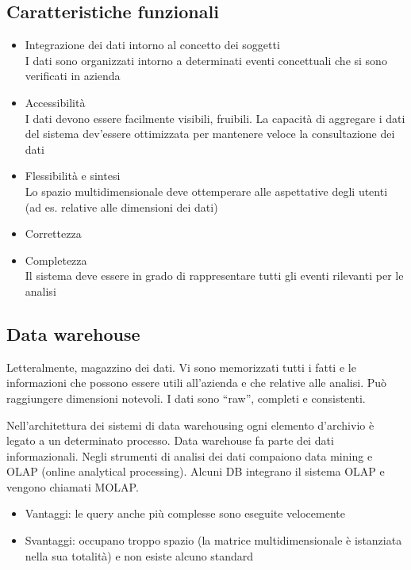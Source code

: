 \subsection{Caratteristiche
funzionali}\label{caratteristiche-funzionali}

\begin{itemize}

\item
  Integrazione dei dati intorno al concetto dei soggetti\\
  I dati sono organizzati intorno a determinati eventi concettuali che
  si sono verificati in azienda
\item
  Accessibilit\`a\\
  I dati devono essere facilmente visibili, fruibili. La capacit\`a di
  aggregare i dati del sistema dev'essere ottimizzata per mantenere
  veloce la consultazione dei dati
\item
  Flessibilit\`a e sintesi\\
  Lo spazio multidimensionale deve ottemperare alle aspettative degli
  utenti (ad es. relative alle dimensioni dei dati)
\item
  Correttezza
\item
  Completezza\\
  Il sistema deve essere in grado di rappresentare tutti gli eventi
  rilevanti per le analisi
\end{itemize}

\subsection{Data warehouse}\label{data-warehouse}

Letteralmente, magazzino dei dati. Vi sono memorizzati tutti i fatti e
le informazioni che possono essere utili all'azienda e che relative alle analisi. 
Pu\`o raggiungere dimensioni notevoli. I dati sono ``raw'', completi e consistenti.

Nell'architettura dei sistemi di data warehousing ogni elemento
d'archivio \`e legato a un determinato processo. Data warehouse fa parte
dei dati informazionali. Negli strumenti di analisi dei dati compaiono
data mining e OLAP (online analytical processing). Alcuni DB integrano
il sistema OLAP e vengono chiamati MOLAP.

\begin{itemize}

\item
  Vantaggi: le query anche pi\`u complesse sono eseguite velocemente
\item
  Svantaggi: occupano troppo spazio (la matrice multidimensionale \`e
  istanziata nella sua totalit\`a) e non esiste alcuno standard
\end{itemize}

